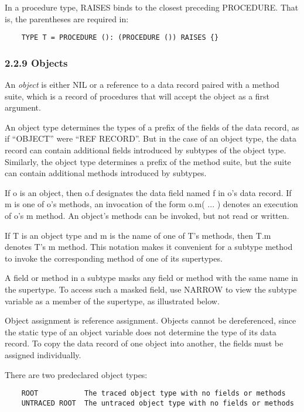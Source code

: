 \documentclass[10pt]{article}
\begin{document}
In a procedure type, RAISES binds to the closest preceding PROCEDURE.  That is,
the parentheses are required in:
\begin{verbatim}
    TYPE T = PROCEDURE (): (PROCEDURE ()) RAISES {}
\end{verbatim}

\subsubsection*{2.2.9 Objects}

An \emph{object} is either NIL or a reference to a data record paired with a
method suite, which is a record of procedures that will accept the object as a
first argument.

An object type determines the types of a prefix of the fields of the data
record, as if ``OBJECT'' were ``REF RECORD''.  But in the case of an object
type, the data record can contain additional fields introduced by subtypes of
the object type.  Similarly, the object type determines a prefix of the method
suite, but the suite can contain additional methods introduced by subtypes.

If o is an object, then o.f designates the data field named f in o's data
record.  If m is one of o's methods, an invocation of the form o.m( ... )
denotes an execution of o's m method.  An object's methods can be invoked, but
not read or written.

If T is an object type and m is the name of one of T's methods, then T.m
denotes T's m method.  This notation makes it convenient for a subtype method
to invoke the corresponding method of one of its supertypes.

A field or method in a subtype masks any field or method with the same name in
the supertype.  To access such a masked field, use NARROW to view the subtype
variable as a member of the supertype, as illustrated below.

Object assignment is reference assignment.  Objects cannot be dereferenced,
since the static type of an object variable does not determine the type of its
data record.  To copy the data record of one object into another, the fields
must be assigned individually.

There are two predeclared object types:
\begin{verbatim}
    ROOT           The traced object type with no fields or methods
    UNTRACED ROOT  The untraced object type with no fields or methods
\end{verbatim}
\end{document}
